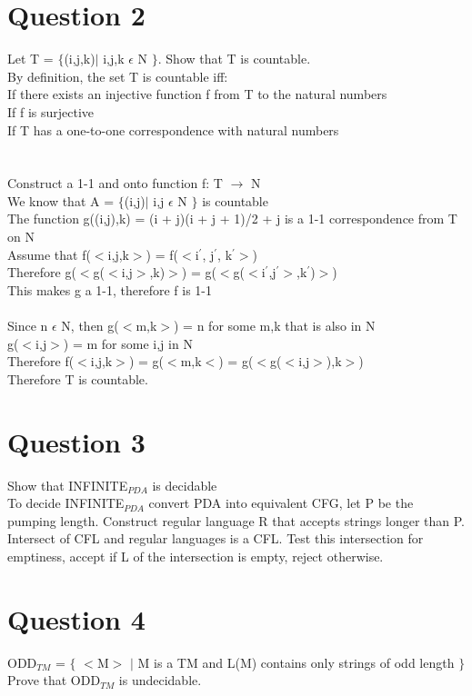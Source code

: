 \documentclass[10pt,a4paper]{article}
\begin{document}
\section*{Question 2}
Let T = $\lbrace$(i,j,k)$\mid$ i,j,k $\epsilon$ N $\rbrace$. Show that T is countable.\\
By definition, the set T is countable iff:\\
If there exists an injective function f from T to the natural numbers\\
If f is surjective\\
If T has a one-to-one correspondence with natural numbers\\
\\\\
Construct a 1-1 and onto function f: T $\rightarrow$ N\\
We know that A = $\lbrace$(i,j)$\mid$ i,j $\epsilon$ N $\rbrace$ is countable\\
The function g((i,j),k) = (i + j)(i + j + 1)/2 + j is a 1-1 correspondence from T on N\\
Assume that f($<$i,j,k$>$) = f($<$i$^{'}$, j$^{'}$, k$^{'}$$>$)\\
Therefore g($<$g($<$i,j$>$,k)$>$) = g($<$g($<$i$^{'}$,j$^{'}$$>$,k$^{'}$)$>$)\\
This makes g a 1-1, therefore f is 1-1\\
\\
Since n $\epsilon$ N, then g($<$m,k$>$) = n for some m,k that is also in N\\
g($<$i,j$>$) = m for some i,j in N\\
Therefore f($<$i,j,k$>$) = g($<$m,k$<$) = g($<$g($<$i,j$>$),k$>$)\\
Therefore T is countable.
\section*{Question 3}
Show that INFINITE$_{PDA}$ is decidable\\
To decide INFINITE$_{PDA}$ convert PDA into equivalent CFG, let P be the pumping length. Construct regular language R that accepts strings longer than P. Intersect of CFL and regular languages is a CFL. Test this intersection for emptiness, accept if L of the intersection is empty, reject otherwise.
\section*{Question 4}
ODD$_{TM}$ = $\lbrace$ $<$M$>$ $\mid$ M is a TM and L(M) contains only strings of odd length $\rbrace$
Prove that ODD$_{TM}$ is undecidable.
\end{document}

